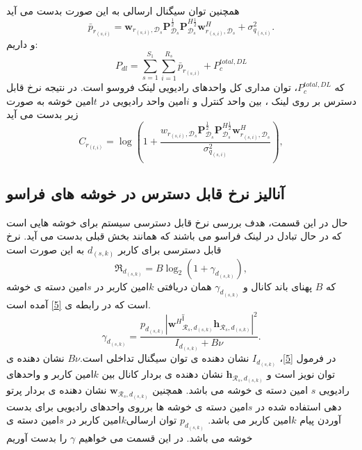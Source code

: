   همچنین توان سیگنال ارسالی به این صورت بدست می آید
\begin{equation}
\bar{p}_{r_{(s,i)}} = \boldsymbol{w}_{r_{(s,i)},\mathcal{D}_{s}} \boldsymbol{P}_{\mathcal{D}_s}^{\frac{1}{2}} \boldsymbol{P}_{\mathcal{D}_s}^{H \frac{1}{2}}   \boldsymbol{w}_{r_{(s,i)},\mathcal{D}_{s}}^H + \sigma_{q_{(s,i)}}^2 .
\end{equation}
و داریم:
\begin{equation}
P_{dl}= \sum_{s=1}^{S_1}\sum_{i=1}^{R_s}\bar{p}_{r_{(s,i)}} + P_c^{total,DL}
\end{equation}
که $ P_c^{total,DL}$، توان مداری کل واحدهای رادیویی لینک فروسو است.
در نتیجه نرخ قابل دسترس بر روی لینک ، بین واحد کنترل و $i$امین واحد رادیویی در $t$امین خوشه  به صورت زیر بدست می آید 
\begin{equation}
C_{r_{(t,i)}} = \log{(1+\frac{w_{r_{(s,i)},\mathcal{D}_{s}} \boldsymbol{P}_{\mathcal{D}_s}^{\frac{1}{2}} \boldsymbol{P}_{\mathcal{D}_s}^{H \frac{1}{2}}   \boldsymbol{w}_{r_{(s,i)},\mathcal{D}_{s}}^H }{ \sigma_{q_{(s,i)}}^2})},
\end{equation}
 \subsection{آنالیز نرخ قابل دسترس در خوشه های فراسو}
 حال در این قسمت، هدف بررسی نرخ قابل دسترسی سیستم برای خوشه هایی است که در حال تبادل در لینک فراسو می باشند که همانند بخش قبلی بدست می آید.
 نرخ قابل دسترسی برای کاربر $d_{(s,k)}$ به این صورت است
\begin{equation}\label{e1}
\mathfrak{R}_{d_{(s,k)}} = B \log_2(1+\gamma_{d_{(s,k)}}),
\end{equation}
که $B$ پهنای باند کانال و $\gamma_{d_{(s,k)}}$ همان  دریافتی $k$امین کاربر در $s$امین دسته ی خوشه است که در رابطه ی \eqref{5} آمده است.
\begin{equation}\label{5}
\gamma_{d_{(s,k)}}= \frac{p_{d_{(s,k)}} |{\boldsymbol{w}^H}_{\mathcal{R}_{s},d_{(s,k)}}^آ\boldsymbol{h}_{\mathcal{R}_s, d_{(s,k)}}|^2}{I_{d_{(s,k)}}+B\nu}.
\end{equation}
در فرمول \eqref{5}، 
$I_{d_{(s,k)}}$
نشان دهنده ی توان سیگنال تداخلی است.$B\nu$
نشان دهنده ی توان نویز است و
$\boldsymbol{h}_{\mathcal{R}_s, d_{(s,k)}}$ 
 نشان دهنده ی بردار کانال بین $k$امین کاربر و واحدهای رادیویی
 $s$
 امین دسته ی خوشه می باشد. همچنین 
 $\boldsymbol{w}_{\mathcal{R}_{s},d_{(s,k)}}$
 نشان دهنده ی بردار پرتو دهی استفاده شده در $s$امین دسته ی خوشه ها برروی واحدهای رادیویی برای بدست آوردن پیام $k$امین کاربر می باشد. 
 $p_{d_{(s,k)}}$
 توان ارسالی$k$امین کاربر در $s$امین دسته ی خوشه می باشد.
 در این قسمت می خواهیم $\gamma$ را بدست آوریم

